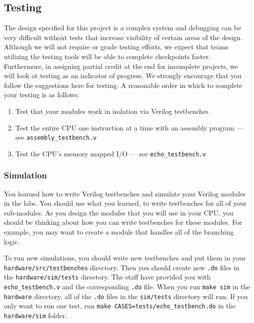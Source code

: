 \documentclass[11pt]{article}
\begin{document}
\subsection{Testing}
\label{testing}

The design specified for this project is a complex system and debugging can be very difficult without tests that increase visibility of certain areas of the design. Although we will not require or grade testing efforts, we expect that teams utilizing the testing tools will be able to complete checkpoints faster. Furthermore, in assigning partial credit at the end for incomplete projects, we will look at testing as an indicator of progress. We strongly encourage that you follow the suggestions here for testing. A reasonable order in which to complete your testing is as follows:

\begin{enumerate}
	\item Test that your modules work in isolation via Verilog testbenches
	\item Test the entire CPU one instruction at a time with an assembly program --- see \verb|assembly_testbench.v|
	\item Test the CPU's memory mapped I/O --- see \verb|echo_testbench.v|
\end{enumerate}

\subsubsection{Simulation}

You learned how to write Verilog testbenches and simulate your Verilog modules in the labs. You should use what you learned, to write testbenches for all of your sub-modules. As you design the modules that you will use in your CPU, you should be thinking about how you can write testbenches for these modules. For example, you may want to create a module that handles all of the branching logic.

To run new simulations, you should write new testbenches and put them in your \verb|hardware/src/testbenches| directory. Then you should create new \verb|.do| files in the \verb|hardware/sim/tests| directory. The staff have provided you with \verb|echo_testbench.v| and the corresponding \verb|.do| file. When you run \verb|make sim| in the \verb|hardware| directory, all of the \verb|.do| files in the \verb|sim/tests| directory will run. If you only want to run one test, run \verb|make CASES=tests/echo_testbench.do| in the \verb|hardware/sim| folder.
\end{document}
